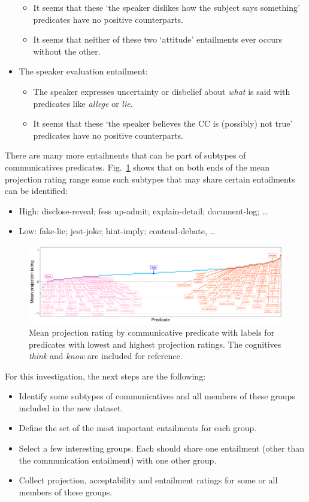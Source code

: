\documentclass[11pt,fleqn]{article}
\newcommand{\figref}[1]{Fig.~\ref{#1}}
\newcommand{\6}{\mbox{$[\hspace*{-.6mm}[$}}
\newcommand{\9}{\mbox{$]\hspace*{-.6mm}]$}}
\begin{document}
\begin{itemize}
\begin{itemize}
		\item It seems that these `the speaker dislikes how the subject says something' predicates have no positive counterparts.
		\item It seems that neither of these two `attitude' entailments ever occurs without the other.
	\end{itemize}
	\item The speaker evaluation entailment:
	\begin{itemize}
		\item The speaker expresses uncertainty or disbelief about \emph{what} is said with predicates like \emph{allege} or \emph{lie}.
		\item It seems that these `the speaker believes the CC is (possibly) not true' predicates have no positive counterparts.
	\end{itemize}
\end{itemize}

There are many more entailments that can be part of subtypes of communicatives predicates. \figref{projcommextr} shows that on both ends of the mean projection rating range some such subtypes that may share certain entailments can be identified: 
\begin{itemize}
	\item High: disclose-reveal; fess up-admit; explain-detail; document-log; … 
	\item Low: fake-lie; jest-joke; hint-imply; contend-debate, …
\end{itemize}


\begin{figure}[H]
	\centering
	\includegraphics[width=1\textwidth]{projection-by-communicative-extremes-41-44}
	\caption{Mean projection rating by communicative predicate with labels for predicates with lowest and highest projection ratings. The cognitives \emph{think} and \emph{know} are included for reference.}
	\label{projcommextr}
\end{figure}

\noindent For this investigation, the next steps are the following:
\begin{itemize}
	\item Identify some subtypes of communicatives and all members of these groups included in the new dataset.
	\item Define the set of the most important entailments for each group.
	\item Select a few interesting groups. Each should share one entailment (other than the communication entailment) with one other group.
	\item Collect projection, acceptability and entailment ratings for some or all members of these groups.
\end{itemize}
\end{document}
